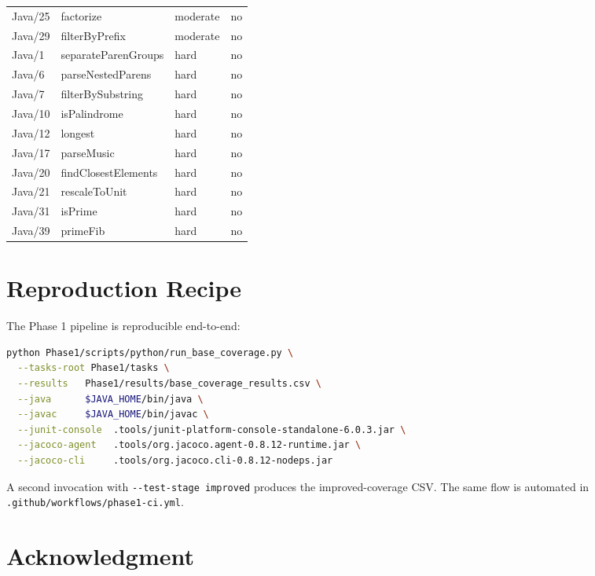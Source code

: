 \documentclass[journal]{IEEEtran}
\begin{document}
\begin{table}[!ht]
\begin{tabular}{@{}llll@{}}
Java/25 & factorize            & moderate & no \\
Java/29 & filterByPrefix       & moderate & no \\
\midrule
Java/1  & separateParenGroups  & hard & no \\
Java/6  & parseNestedParens    & hard & no \\
Java/7  & filterBySubstring    & hard & no \\
Java/10 & isPalindrome         & hard & no \\
Java/12 & longest              & hard & no \\
Java/17 & parseMusic           & hard & no \\
Java/20 & findClosestElements  & hard & no \\
Java/21 & rescaleToUnit        & hard & no \\
Java/31 & isPrime              & hard & no \\
Java/39 & primeFib             & hard & no \\
\bottomrule
\end{tabular}
\end{table}

\section{Reproduction Recipe}\label{app:repro}

The Phase 1 pipeline is reproducible end-to-end:
\begin{lstlisting}[language=bash, caption=Reproducing the Phase 1 coverage CSVs.]
python Phase1/scripts/python/run_base_coverage.py \
  --tasks-root Phase1/tasks \
  --results   Phase1/results/base_coverage_results.csv \
  --java      $JAVA_HOME/bin/java \
  --javac     $JAVA_HOME/bin/javac \
  --junit-console  .tools/junit-platform-console-standalone-6.0.3.jar \
  --jacoco-agent   .tools/org.jacoco.agent-0.8.12-runtime.jar \
  --jacoco-cli     .tools/org.jacoco.cli-0.8.12-nodeps.jar
\end{lstlisting}

A second invocation with \verb|--test-stage improved| produces the
improved-coverage CSV. The same flow is automated in
\texttt{.github/workflows/phase1-ci.yml}.

\section*{Acknowledgment}
\end{document}
